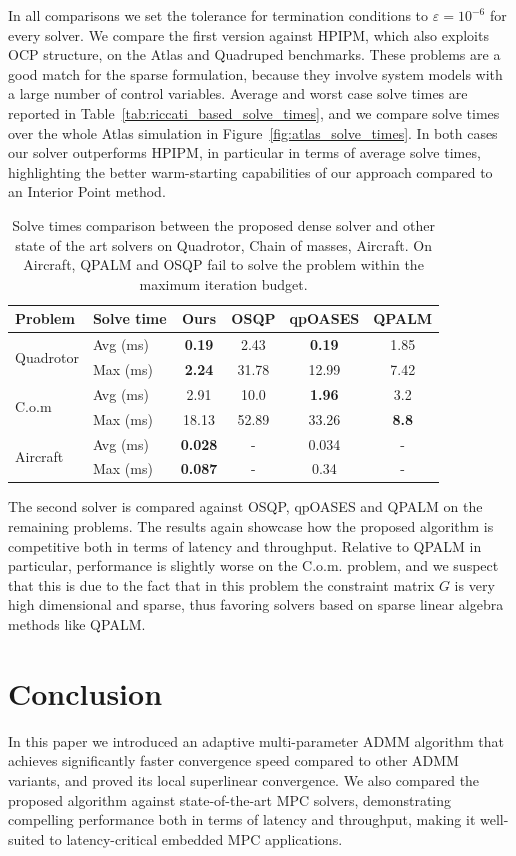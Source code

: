 \documentclass[letterpaper, 10 pt, conference]{ieeeconf}  %
\begin{document}
In all comparisons we set the tolerance for termination conditions to $\varepsilon = 10^{-6}$ for every solver. We compare the first version against HPIPM, which also exploits OCP structure, on the Atlas and Quadruped benchmarks. These problems are a good match for the sparse formulation, because they involve system models with a large number of control variables. Average and worst case solve times are reported in Table~\ref{tab:riccati_based_solve_times}, and we compare solve times over the whole Atlas simulation in Figure~\ref{fig:atlas_solve_times}. In both cases our solver outperforms HPIPM, in particular in terms of average solve times, highlighting the better warm-starting capabilities of our approach compared to an Interior Point method.
\begin{table}
\centering
\begin{tabular}{llcccc}
\toprule
Problem & Solve time & Ours & OSQP & qpOASES & QPALM \\
\midrule
\multirow{2}{*}{Quadrotor} 
    & Avg (ms) & \textbf{0.19} & 2.43 & \textbf{0.19} & 1.85 \\
    & Max (ms) & \textbf{2.24} & 31.78 & 12.99 & 7.42 \\
\midrule
\multirow{2}{*}{C.o.m} 
    & Avg (ms) & 2.91 & 10.0 & \textbf{1.96} & 3.2 \\
    & Max (ms) & 18.13 & 52.89 & 33.26 & \textbf{8.8} \\
\midrule
\multirow{2}{*}{Aircraft} 
    & Avg (ms) & \textbf{0.028} & - & 0.034 & - \\
    & Max (ms) & \textbf{0.087} & - & 0.34  & - \\
\bottomrule
\end{tabular}
\caption{Solve times comparison between the proposed dense solver and other state of the art solvers on Quadrotor, Chain of masses, Aircraft. On Aircraft, QPALM and OSQP fail to solve the problem within the maximum iteration budget.}
\end{table}
The second solver is compared against OSQP, qpOASES and QPALM \cite{Stellato2020, Ferreau2014, qpalm} on the remaining problems. The results again showcase how the proposed algorithm is competitive both in terms of latency and throughput. Relative to QPALM in particular, performance is slightly worse on the C.o.m. problem, and we suspect that this is due to the fact that in this problem the constraint matrix $G$ is very high dimensional and sparse, thus favoring solvers based on sparse linear algebra methods like QPALM.

\section{Conclusion} \label{sec:conclusions}
In this paper we introduced an adaptive multi-parameter ADMM algorithm that achieves significantly faster convergence speed compared to other ADMM variants, and proved its local superlinear convergence. 
We also compared the proposed algorithm against state-of-the-art MPC solvers, demonstrating compelling performance both in terms of latency and throughput, making it well-suited to latency-critical embedded MPC applications.
\end{document}
